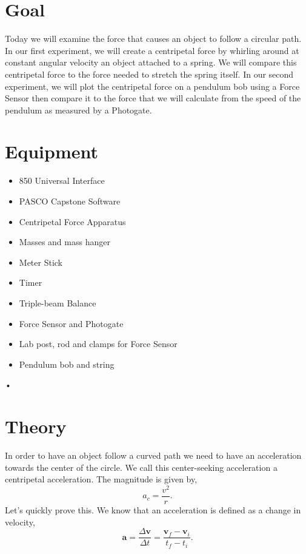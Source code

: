 \documentclass[main.tex]{subfiles}
\begin{document}
\section*{Goal}
Today we will examine the force that causes an object to follow a circular path. In our first experiment, we will create a centripetal force by whirling around at constant angular velocity an object attached to a spring. We will compare this centripetal force to the force needed to stretch the spring itself. In our second experiment, we will plot the centripetal force on a pendulum bob using a Force Sensor then compare it to the force that we will calculate from the speed of the pendulum as measured by a Photogate.

\section*{Equipment}
\begin{itemize}
\item
850 Universal Interface
\item
PASCO Capstone Software
\item
Centripetal Force Apparatus
\item
Masses and mass hanger
\item
Meter Stick
\item
Timer
\item
Triple-beam Balance
\item
Force Sensor and Photogate
\item
Lab post, rod and clamps for Force Sensor
\item
Pendulum bob and string
\end{itemize}•

\section*{Theory}
In order to have an object follow a curved path we need to have an acceleration towards the center of the circle. We call this center-seeking acceleration a centripetal acceleration. The magnitude is given by,
\begin{equation}\label{eq:CenAcc}
a_{c}=\frac{v^2}{r}.
\end{equation}
Let's quickly prove this. We know that an acceleration is defined as a change in velocity,
\begin{equation}\label{eq:Acc}
\mathbf{a} = \frac{\Delta \mathbf{v}}{\Delta t} = \frac{\mathbf{v}_f-\mathbf{v}_i}{t_f-t_i}.
\end{equation}
\end{document}
